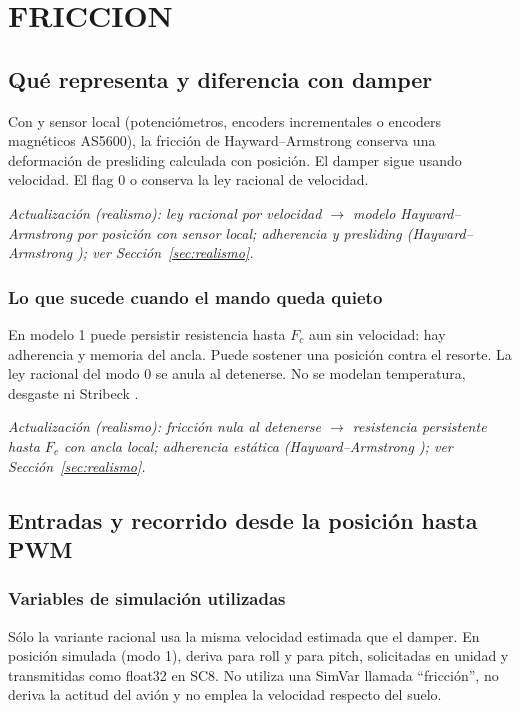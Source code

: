 \section{FRICCION}
\label{sec:friccion}

\subsection{Qué representa y diferencia con damper}
Con  y sensor local (potenciómetros, encoders incrementales o encoders magnéticos AS5600), la fricción de Hayward--Armstrong \cite{hayward2000} conserva una deformación de presliding calculada con posición. El damper sigue usando velocidad. El flag 0 o  conserva la ley racional de velocidad.

\textit{Actualización (realismo): ley racional por velocidad $\rightarrow$ modelo Hayward--Armstrong \cite{hayward2000} por posición con sensor local; adherencia y presliding (Hayward--Armstrong \cite{hayward2000}); ver Sección~\ref{sec:realismo}.}

\subsubsection{Lo que sucede cuando el mando queda quieto}
En modelo 1 puede persistir resistencia hasta $F_c$ aun sin velocidad: hay adherencia y memoria del ancla. Puede sostener una posición contra el resorte. La ley racional del modo 0 se anula al detenerse. No se modelan temperatura, desgaste ni Stribeck \cite{armstrong1994}.

\textit{Actualización (realismo): fricción nula al detenerse $\rightarrow$ resistencia persistente hasta $F_c$ con ancla local; adherencia estática (Hayward--Armstrong \cite{hayward2000}); ver Sección~\ref{sec:realismo}.}

\subsection{Entradas y recorrido desde la posición hasta PWM}
\subsubsection{Variables de simulación utilizadas}
Sólo la variante racional usa la misma velocidad estimada que el damper. En posición simulada (modo 1), deriva  para roll y  para pitch, solicitadas en unidad  y transmitidas como float32 en SC8. No utiliza una SimVar llamada ``fricción'', no deriva la actitud del avión y no emplea la velocidad respecto del suelo.

